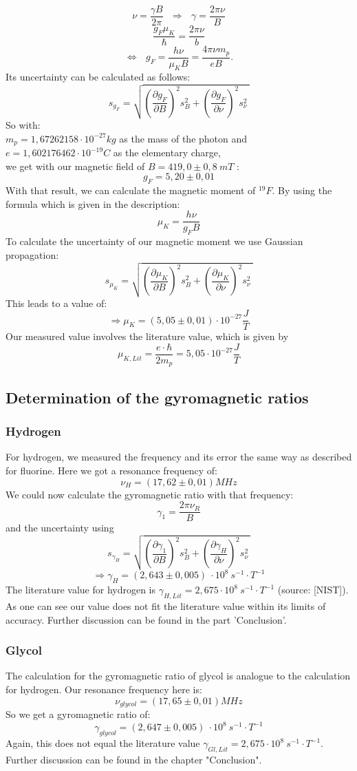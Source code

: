 \[ \nu = \frac{\gamma B}{2 \pi} ~~~ \Rightarrow ~~~ \gamma = \frac{2 \pi \nu}{B} \]
\clearpage
\[ \frac{g_F \mu_K}{\hbar} = \frac{2 \pi \nu}{b} \]
\[ \Leftrightarrow ~~~ g_F= \frac{h \nu}{\mu_K B}= \frac{4 \pi \nu m_p}{e B} .\]
Its uncertainty can be calculated as follows:
\[ s_{g_{F}}= \sqrt{\left(\frac{\partial g_F}{\partial B} \right)^2 s_B^2 + \left( \frac{\partial g_F}{\partial \nu}  \right)^2 s_{\nu}^2~} \]
So with:\\
$m_p = 1,67262158 \cdot 10^{-27}kg$ as the mass of the photon and\\
$e = 1,602176462 \cdot 10^{-19} C$ as the elementary charge,\\
we get with our magnetic field of $B=419,0 \pm 0,8 ~ mT$ :
\[ g_F = 5,20 \pm 0,01 \]
With that result, we can calculate the magnetic moment of $^{19}F$. By using the formula which is given in the description:
\[ \mu_{K} =\frac{h \nu}{g_{F} B} \]
To calculate the uncertainty of our magnetic moment we use Gaussian propagation:
\[ s_{\mu_{K}}=\sqrt{\left(\frac{\partial \mu_{K}}{\partial B} \right)^2 s_B^2 + \left( \frac{\partial \mu_{K}}{\partial \nu}  \right)^2 s_{\nu}^2~} \]
This leads to a value of:
\[ \Rightarrow \mu_{K}=(5,05 \pm 0,01) \cdot 10^{-27} \frac{J}{T} \]
Our measured value involves the literature value, which is given by
\[ \mu_{K,Lit} =\frac{e\cdot\hbar}{2m_{p}}= 5,05 \cdot 10^{-27} \frac{J}{T} \]
\subsection{Determination of the gyromagnetic ratios}
\subsubsection*{Hydrogen}
For hydrogen, we measured the frequency and its error the same way as described for fluorine. Here we got a resonance frequency of:
\[ \nu_{H} = (17,62 \pm 0,01)MHz \]
We could now calculate the gyromagnetic ratio with that frequency:
\[ \gamma_{1}=\frac{2 \pi \nu_{R}}{B} \]
and the uncertainty using
\[ s_{\gamma_{H}}=\sqrt{\left(\frac{\partial \gamma_{1}}{\partial B} \right)^2 s_B^2 + \left( \frac{\partial \gamma_{H}}{\partial \nu}  \right)^2 s_{\nu}^2~}  \]
\[ \Rightarrow \gamma_{H}=(2,643 \pm 0,005)~\cdot 10^{8}~ s^{-1} \cdot T^{-1} \]
The literature value for hydrogen is $\gamma_{H,Lit} = 2,675 \cdot 10^{8} ~ s^{-1} \cdot T^{-1} $ (source: [NIST]). As one can see our value does not fit the literature value within its limits of accuracy. Further discussion can be found in the part 'Conclusion'.
\subsubsection*{Glycol}
The calculation for the gyromagnetic ratio of glycol is analogue to the calculation for hydrogen. Our resonance frequency here is:
\[ \nu_{glycol} = (17,65 \pm 0,01)MHz \]
So we get a gyromagnetic ratio of:
\[ \gamma_{glycol}=(2,647 \pm 0,005)~\cdot 10^{8} ~ s^{-1} \cdot T^{-1} \]
Again, this does not equal the literature value $\gamma_{Gl,Lit}=2,675\cdot 10^{8} ~ s^{-1} \cdot T^{-1} $. Further discussion can be found in the chapter "Conclusion".